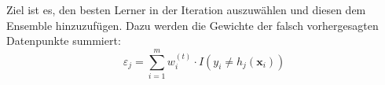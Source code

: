Ziel ist es, den besten Lerner in der Iteration auszuwählen und diesen dem Ensemble hinzuzufügen. Dazu werden
die Gewichte der falsch vorhergesagten Datenpunkte summiert:
$$
    \varepsilon_j = \sum_{i=1}^m w^{(t)}_i\cdot I\left(y_i \neq h_j\left(\boldsymbol{x}_i\right)\right)
$$